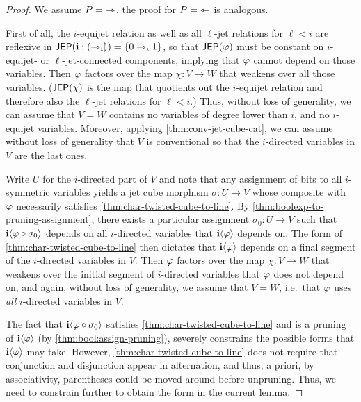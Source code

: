 \documentclass[a4paper]{memoir}
\begin{document}
\begin{proof}
	We assume $P = {\rightarrowtriangle}$, the proof for $P = {\leftarrowtriangle}$ is analogous.

	First of all, the $i$-equijet relation as well as all $\ell$-jet relations for $\ell < i$ are reflexive in $\mathsf{JEP}(\mathbf{i} : {\llparenthesis \rightarrowtriangle_i \rrparenthesis}) = \mathopen{}\left\{ 0 \rightarrowtriangle_i 1 \right\}\mathclose{}$, so that $\mathsf{JEP}(\varphi)$ must be constant on $i$-equijet- or $\ell$-jet-connected components, implying that $\varphi$ cannot depend on those variables.
	Then $\varphi$ factors over the map $\chi : V \to W$ that weakens over all those variables.
	($\mathsf{JEP}(\chi)$ is the map that quotients out the $i$-equijet relation and therefore also the $\ell$-jet relations for $\ell < i$.)
	Thus, without loss of generality, we can assume that $V = W$ contains no variables of degree lower than $i$, and no $i$-equijet variables.
	Moreover, applying \cref{thm:conv-jet-cube-cat}, we can assume without loss of generality that $V$ is conventional so that the $i$-directed variables in $V$ are the last ones.
	
	Write $U$ for the $i$-directed part of $V$ and note that any assignment of bits to all $i$-symmetric variables yields a jet cube morphism $\sigma : U \to V$ whose composite with $\varphi$ necessarily satisfies \cref{thm:char-twisted-cube-to-line}.
	By \cref{thm:boolexp-to-pruning-assignment}, there exists a particular assignment $\sigma_0 : U \to V$ such that $\mathbf{i} \langle \varphi \circ \sigma_0 \rangle$ depends on all $i$-directed variables that $\mathbf{i} \langle \varphi \rangle$ depends on.
	The form of \cref{thm:char-twisted-cube-to-line} then dictates that $\mathbf{i} \langle \varphi \rangle$ depends on a final segment of the $i$-directed variables in $V$.
	Then $\varphi$ factors over the map $\chi : V \to W$ that weakens over the initial segment of $i$-directed variables that $\varphi$ does not depend on, and again, without loss of generality, we assume that $V = W$, i.e.\ that $\varphi$ uses \emph{all} $i$-directed variables in $V$.
	
	The fact that $\mathbf{i} \langle \varphi \circ \sigma_0 \rangle$ satisfies \cref{thm:char-twisted-cube-to-line} and is a pruning of $\mathbf{i} \langle \varphi \rangle$ (by \cref{thm:bool:assign-pruning}), severely constrains the possible forms that $\mathbf{i} \langle \varphi \rangle$ may take.
	However, \cref{thm:char-twisted-cube-to-line} does not require that conjunction and disjunction appear in alternation, and thus, a priori, by associativity, parentheses could be moved around before unpruning.
	Thus, we need to constrain further to obtain the form in the current lemma.
	
	

\end{proof}
\end{document}

